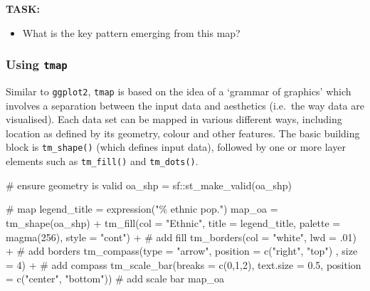 \documentclass[
  letterpaper,
  krantz2]{style/krantz}
\newenvironment{Shaded}{\begin{snugshade}}{\end{snugshade}}
\newcommand{\AttributeTok}[1]{\textcolor[rgb]{0.40,0.45,0.13}{#1}}
\newcommand{\CommentTok}[1]{\textcolor[rgb]{0.37,0.37,0.37}{#1}}
\newcommand{\DecValTok}[1]{\textcolor[rgb]{0.68,0.00,0.00}{#1}}
\newcommand{\FloatTok}[1]{\textcolor[rgb]{0.68,0.00,0.00}{#1}}
\newcommand{\FunctionTok}[1]{\textcolor[rgb]{0.28,0.35,0.67}{#1}}
\newcommand{\NormalTok}[1]{\textcolor[rgb]{0.00,0.23,0.31}{#1}}
\newcommand{\OtherTok}[1]{\textcolor[rgb]{0.00,0.23,0.31}{#1}}
\newcommand{\SpecialCharTok}[1]{\textcolor[rgb]{0.37,0.37,0.37}{#1}}
\newcommand{\StringTok}[1]{\textcolor[rgb]{0.13,0.47,0.30}{#1}}
\providecommand{\tightlist}{%
  \setlength{\itemsep}{0pt}\setlength{\parskip}{0pt}}\usepackage{longtable,booktabs,array}
\begin{document}
\textbf{TASK:}

\begin{itemize}
\tightlist
\item
  What is the key pattern emerging from this map?
\end{itemize}

\hypertarget{using-tmap}{%
\subsubsection{\texorpdfstring{Using
\texttt{tmap}}{Using tmap}}\label{using-tmap}}

Similar to \texttt{ggplot2}, \texttt{tmap} is based on the idea of a
`grammar of graphics' which involves a separation between the input data
and aesthetics (i.e.~the way data are visualised). Each data set can be
mapped in various different ways, including location as defined by its
geometry, colour and other features. The basic building block is
\texttt{tm\_shape()} (which defines input data), followed by one or more
layer elements such as \texttt{tm\_fill()} and \texttt{tm\_dots()}.

\begin{Shaded}
\begin{Highlighting}[]
\CommentTok{\# ensure geometry is valid}
\NormalTok{oa\_shp }\OtherTok{=}\NormalTok{ sf}\SpecialCharTok{::}\FunctionTok{st\_make\_valid}\NormalTok{(oa\_shp)}

\CommentTok{\# map}
\NormalTok{legend\_title }\OtherTok{=} \FunctionTok{expression}\NormalTok{(}\StringTok{"\% ethnic pop."}\NormalTok{)}
\NormalTok{map\_oa }\OtherTok{=} \FunctionTok{tm\_shape}\NormalTok{(oa\_shp) }\SpecialCharTok{+}
  \FunctionTok{tm\_fill}\NormalTok{(}\AttributeTok{col =} \StringTok{"Ethnic"}\NormalTok{, }\AttributeTok{title =}\NormalTok{ legend\_title, }\AttributeTok{palette =} \FunctionTok{magma}\NormalTok{(}\DecValTok{256}\NormalTok{), }\AttributeTok{style =} \StringTok{"cont"}\NormalTok{) }\SpecialCharTok{+} \CommentTok{\# add fill}
  \FunctionTok{tm\_borders}\NormalTok{(}\AttributeTok{col =} \StringTok{"white"}\NormalTok{, }\AttributeTok{lwd =}\NormalTok{ .}\DecValTok{01}\NormalTok{)  }\SpecialCharTok{+} \CommentTok{\# add borders}
  \FunctionTok{tm\_compass}\NormalTok{(}\AttributeTok{type =} \StringTok{"arrow"}\NormalTok{, }\AttributeTok{position =} \FunctionTok{c}\NormalTok{(}\StringTok{"right"}\NormalTok{, }\StringTok{"top"}\NormalTok{) , }\AttributeTok{size =} \DecValTok{4}\NormalTok{) }\SpecialCharTok{+} \CommentTok{\# add compass}
  \FunctionTok{tm\_scale\_bar}\NormalTok{(}\AttributeTok{breaks =} \FunctionTok{c}\NormalTok{(}\DecValTok{0}\NormalTok{,}\DecValTok{1}\NormalTok{,}\DecValTok{2}\NormalTok{), }\AttributeTok{text.size =} \FloatTok{0.5}\NormalTok{, }\AttributeTok{position =}  \FunctionTok{c}\NormalTok{(}\StringTok{"center"}\NormalTok{, }\StringTok{"bottom"}\NormalTok{)) }\CommentTok{\# add scale bar}
\NormalTok{map\_oa}
\end{Highlighting}
\end{Shaded}
\end{document}

